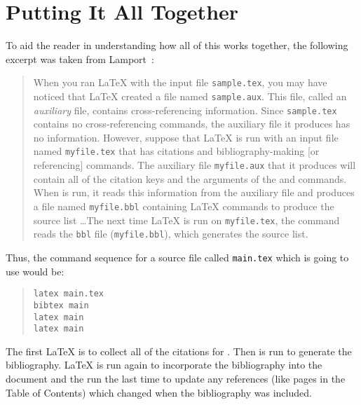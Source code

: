 \section{Putting It All Together}
\label{BBL}
To aid the reader in understanding how all of this works together, the following 
excerpt was taken from Lamport~\cite{lamport}:
\begin{quotation}\singlespace
When you ran \LaTeX{} with the input file {\tt sample.tex}, you may have
noticed that \LaTeX{} created a file named {\tt sample.aux}.  This file,
called an {\em auxiliary} file, contains cross-referencing information.  Since
{\tt sample.tex} contains no cross-referencing commands, the auxiliary file it
produces has no information.  However, suppose that \LaTeX{} is run with an
input file named {\tt myfile.tex} that has citations and bibliography-making
[or referencing] commands.  The auxiliary file {\tt myfile.aux} that it produces
will contain all of the citation keys and the arguments of the {\tt \verb||}
and {\tt\verb||} commands.  When \BibTeX{} is run, it reads
this information from the auxiliary file and produces a file named {\tt myfile.bbl}
containing \LaTeX{} commands to produce the source list \ldots The next time
\LaTeX{} is run on {\tt myfile.tex}, the {\tt \verb||} command reads
the {\tt bbl} file ({\tt myfile.bbl}), which generates the source list.
\end{quotation}

Thus, the command sequence for a source file called {\tt main.tex} which is going to
use \BibTeX{} would be:
\begin{quote}\singlespace\tt\begin{verbatim}
latex main.tex
bibtex main
latex main
latex main
\end{verbatim}\end{quote}
The first \LaTeX{} is to collect all of the citations for \BibTeX{}.  Then
\BibTeX{} is run to generate the bibliography.  \LaTeX{} is run again to
incorporate the bibliography into the document and the run the last time to
update any references (like pages in the Table of Contents) which changed when
the bibliography was included.
